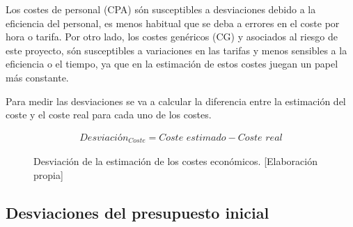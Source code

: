 Los costes de personal (CPA) són susceptibles a desviaciones debido a la eficiencia del personal, es menos
habitual que se deba a errores en el coste por hora o tarifa. Por otro lado, los costes genéricos (CG) y asociados
al riesgo de este proyecto, són susceptibles a variaciones en las tarifas y menos sensibles a la eficiencia o el
tiempo, ya que en la estimación de estos costes juegan un papel más constante.

Para medir las desviaciones se va a calcular la diferencia entre la estimación
del coste y el coste real para cada uno de los costes.
\begin{figure}[H]
    \begin{align*}
        \textit{Desviación}_{Coste} = \textit{Coste estimado} - \textit{Coste real}
    \end{align*}
    \caption{Desviación de la estimación de los costes económicos.  [Elaboración propia]}
\end{figure}


\subsection{Desviaciones del presupuesto inicial}